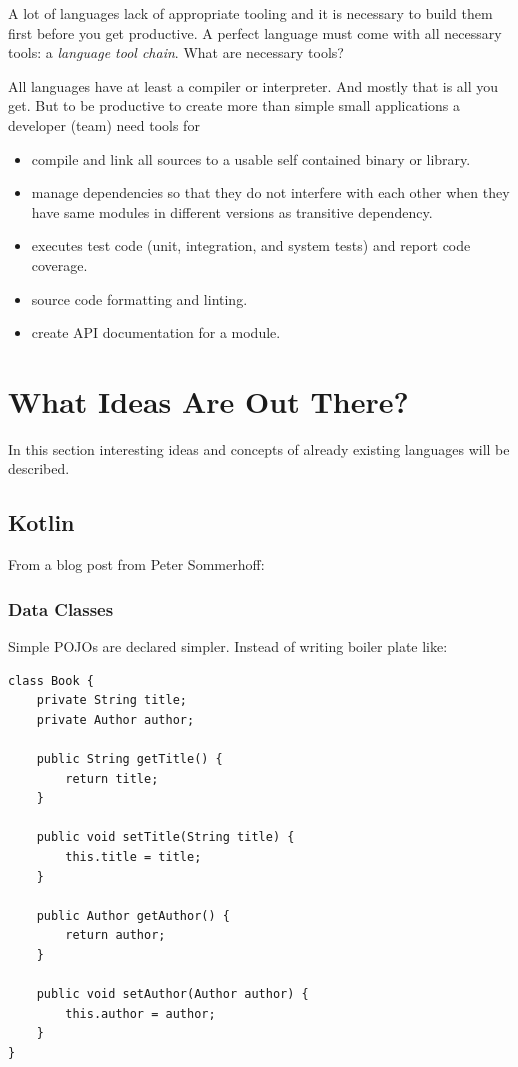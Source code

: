 \documentclass[11pt, a4paper]{report}
\begin{document}
A lot of languages lack of appropriate tooling and it is necessary to build them first before you get productive. A perfect language must come with all necessary tools: a \textit{language tool chain}. What are necessary tools?

All languages have at least a compiler or interpreter. And mostly that is all you get. But to be productive to create more than simple small applications a developer (team) need tools for

\begin{itemize}
    \item compile and link all sources to a usable self contained binary or library.
    \item manage dependencies so that they do not interfere with each other when they have same modules in different versions as transitive dependency.
    \item executes test code (unit, integration, and system tests) and report code coverage.
    \item source code formatting and linting.
    \item create API documentation for a module.
\end{itemize}

\chapter{What Ideas Are Out There?}

In this section interesting ideas and concepts of already existing languages will be described.

\section{Kotlin}

From a blog post from Peter Sommerhoff\cite{kotlin-sommerhoff}:

\subsection{Data Classes}

Simple POJOs are declared simpler. Instead of writing boiler plate like:

\begin{lstlisting}
class Book {
    private String title;
    private Author author;

    public String getTitle() {
        return title;
    }
    
    public void setTitle(String title) {
        this.title = title;
    }

    public Author getAuthor() {
        return author;
    }
    
    public void setAuthor(Author author) {
        this.author = author;
    }
}
\end{lstlisting}
\end{document}
